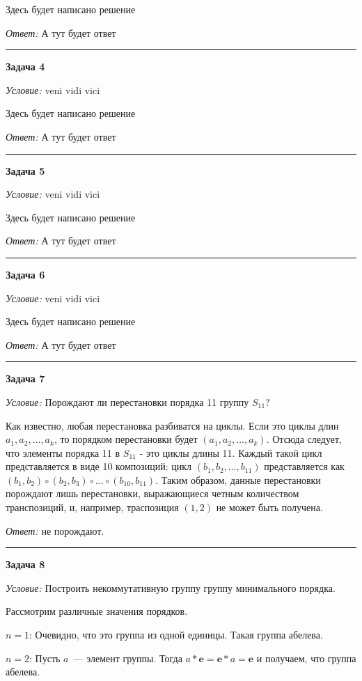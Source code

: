 \documentclass[12pt,a4paper]{article}
\newcommand{\sbs}{\large \bfseries}
\newcommand{\rl}{\vspace{16pt} \hrule \vspace{8pt}}
\begin{document}
Здесь будет написано решение

{\itshape Ответ: } А тут будет ответ




\rl
{\sbs Задача 4}

{\itshape Условие: } veni vidi vici

Здесь будет написано решение

{\itshape Ответ: } А тут будет ответ




\rl
{\sbs Задача 5}

{\itshape Условие: } veni vidi vici

Здесь будет написано решение

{\itshape Ответ: } А тут будет ответ




\rl
{\sbs Задача 6}

{\itshape Условие: } veni vidi vici

Здесь будет написано решение

{\itshape Ответ: } А тут будет ответ




\rl
{\sbs Задача 7}

{\itshape Условие: } Порождают ли перестановки порядка 11 группу $S_{11}$?

Как известно, любая перестановка разбиватся на циклы. Если это циклы длин $a_1, a_2,\ldots, a_k$, то порядком перестановки будет $(a_1,a_2,\ldots,a_k)$. Отсюда следует, что элементы порядка 11 в $S_{11}$ - это циклы длины 11. Каждый такой цикл представляется в виде 10 композиций: цикл $(b_1,b_2,\ldots,b_{11})$ представляется как $(b_1,b_2)\circ (b_2,b_3)\circ\ldots\circ (b_{10},b_{11})$. Таким образом, данные перестановки порождают лишь перестановки, выражающиеся четным количеством транспозиций, и, например, траспозиция $(1,2)$ не может быть получена.

{\itshape Ответ:} не порождают.





\rl
{\sbs Задача 8}

{\itshape Условие: } Построить некоммутативную группу группу минимального порядка.

Рассмотрим различные значения порядков.

$n=1$: Очевидно, что это группа из одной единицы. Такая группа абелева.

$n=2$: Пусть $a$~--- элемент группы. Тогда $a*\boldsymbol{e} = \boldsymbol{e}*a = \boldsymbol{e}$ и получаем, что группа абелева.
\end{document}
